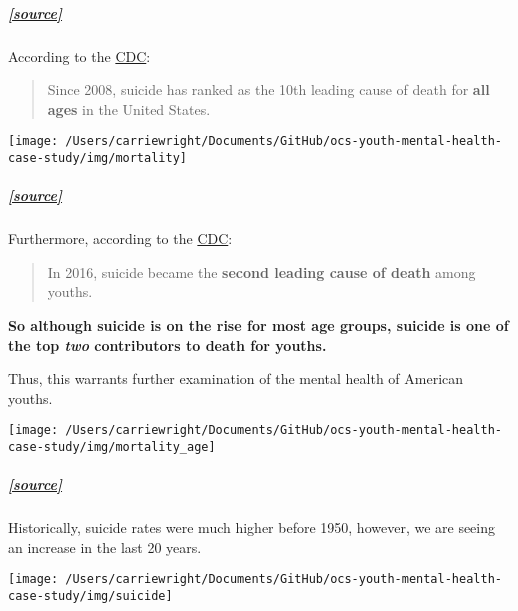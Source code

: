 \documentclass[
]{article}
\begin{document}
\hypertarget{source-4}{%
\subparagraph{\texorpdfstring{\href{https://www.cdc.gov/nchs/products/databriefs/db309.htm}{{[}source{]}}}{{[}source{]}}}\label{source-4}}

According to the
\href{https://www.cdc.gov/nchs/products/databriefs/db309.htm}{CDC}:

\begin{quote}
Since 2008, suicide has ranked as the 10th leading cause of death for
\textbf{all ages} in the United States.
\end{quote}

\begin{center}\texttt{[image: /Users/carriewright/Documents/GitHub/ocs-youth-mental-health-case-study/img/mortality]} \end{center}

\hypertarget{source-5}{%
\subparagraph{\texorpdfstring{\href{https://www.cdc.gov/nchs/data/databriefs/db293.pdf}{{[}source{]}}}{{[}source{]}}}\label{source-5}}

Furthermore, according to the
\href{https://www.cdc.gov/nchs/products/databriefs/db309.htm}{CDC}:

\begin{quote}
In 2016, suicide became the \textbf{second leading cause of death} among
youths.
\end{quote}

\textbf{So although suicide is on the rise for most age groups, suicide
is one of the top \emph{two} contributors to death for youths.}

Thus, this warrants further examination of the mental health of American
youths.

\begin{center}\texttt{[image: /Users/carriewright/Documents/GitHub/ocs-youth-mental-health-case-study/img/mortality\_age]} \end{center}

\hypertarget{source-6}{%
\subparagraph{\texorpdfstring{\href{https://www.cdc.gov/nchs/data/nvsr/nvsr68/nvsr68_06-508.pdf}{{[}source{]}}}{{[}source{]}}}\label{source-6}}

Historically, suicide rates were much higher before 1950, however, we
are seeing an increase in the last 20 years.

\begin{center}\texttt{[image: /Users/carriewright/Documents/GitHub/ocs-youth-mental-health-case-study/img/suicide]} \end{center}
\end{document}
